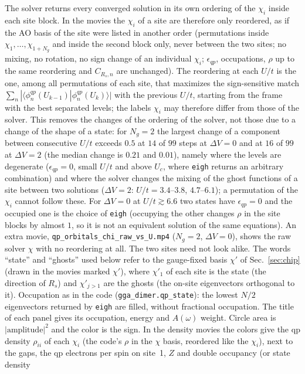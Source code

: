 \documentclass[11pt]{article}
\newcommand{\Ng}{N_{g}}
\newcommand{\dV}{\Delta V}
\begin{document}
The solver returns every converged solution in its own ordering of the $\chi_i$ inside each site block. In the movies the $\chi_i$ of a site are therefore only reordered, as if the AO basis of the site were listed in another order (permutations inside $\chi_1,\dots,\chi_{1+\Ng}$ and inside the second block only, never between the two sites; no mixing, no rotation, no sign change of an individual $\chi_i$; $\epsilon_{qp}$, occupations, $\rho$ up to the same reordering and $C_{R_s,n}$ are unchanged). The reordering at each $U/t$ is the one, among all permutations of each site, that maximizes the sign-sensitive match $\sum_n|\langle\phi^{qp}_n(U_{k-1})|\phi^{qp}_n(U_k)\rangle|$ with the previous $U/t$, starting from the frame with the best separated levels; the labels $\chi_i$ may therefore differ from those of the solver. This removes the changes of the ordering of the solver, not those due to a change of the shape of a state: for $\Ng=2$ the largest change of a component between consecutive $U/t$ exceeds $0.5$ at $14$ of $99$ steps at $\dV=0$ and at $16$ of $99$ at $\dV=2$ (the median change is $0.21$ and $0.01$), namely where the levels are degenerate ($\epsilon_{qp}=0$, small $U/t$ and above $U_c$, where \texttt{eigh} returns an arbitrary combination) and where the solver changes the mixing of the ghost functions of a site between two solutions ($\dV=2$: $U/t=3.4$--$3.8$, $4.7$--$6.1$); a permutation of the $\chi_i$ cannot follow these. For $\dV=0$ at $U/t\gtrsim6.6$ two states have $\epsilon_{qp}=0$ and the occupied one is the choice of \texttt{eigh} (occupying the other changes $\rho$ in the site blocks by almost $1$, so it is not an equivalent solution of the same equations). An extra movie, \texttt{qp\_orbitals\_chi\_raw\_vs\_U.mp4} ($\Ng=2$, $\dV=0$), shows the raw solver $\chi$ with no reordering at all. The two sites need not look alike. The words ``state'' and ``ghosts'' used below refer to the gauge-fixed basis $\chi'$ of Sec.~\ref{sec:chip} (drawn in the movies marked $\chi'$), where $\chi'_1$ of each site is the state (the direction of $R_s$) and $\chi'_{j>1}$ are the ghosts (the on-site eigenvectors orthogonal to it). Occupation as in the code (\texttt{gga\_dimer.qp\_state}): the lowest $N/2$ eigenvectors returned by \texttt{eigh} are filled,
without fractional occupation. The title of each panel gives its occupation, energy and $A(\omega)$ weight. Circle area is $|\text{amplitude}|^2$ and the color is the sign. In the density movies the colors give the qp density $\rho_{ii}$ of each $\chi_i$ (the code's $\rho$ in the $\chi$ basis, reordered like the $\chi_i$), next to the gaps, the qp electrons per spin on site~1, $Z$ and double occupancy (or state density
\end{document}

